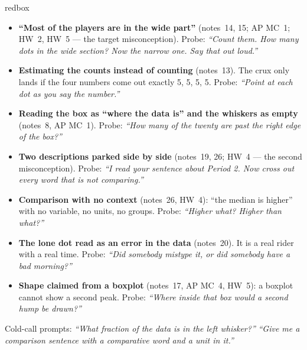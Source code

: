 \documentclass[10pt]{article}
\begin{document}
\boxguard
\begin{skillbox}{redbox}
\begin{itemize}[leftmargin=1.2em, nosep]
  \item \textbf{``Most of the players are in the wide part''} (notes~14, 15; AP MC~1; HW~2, HW~5
        --- the target misconception). Probe: \emph{``Count them. How many dots in the wide
        section? Now the narrow one. Say that out loud.''}
  \item \textbf{Estimating the counts instead of counting} (notes~13). The crux only lands if the
        four numbers come out exactly 5, 5, 5, 5. Probe: \emph{``Point at each dot as you say the
        number.''}
  \item \textbf{Reading the box as ``where the data is'' and the whiskers as empty} (notes~8,
        AP MC~1). Probe: \emph{``How many of the twenty are past the right edge of the box?''}
  \item \textbf{Two descriptions parked side by side} (notes~19, 26; HW~4 --- the second
        misconception). Probe: \emph{``I read your sentence about Period 2. Now cross out every
        word that is not comparing.''}
  \item \textbf{Comparison with no context} (notes~26, HW~4): ``the median is higher'' with no
        variable, no units, no groups. Probe: \emph{``Higher what? Higher than what?''}
  \item \textbf{The lone dot read as an error in the data} (notes~20). It is a real rider with a
        real time. Probe: \emph{``Did somebody mistype it, or did somebody have a bad morning?''}
  \item \textbf{Shape claimed from a boxplot} (notes~17, AP MC~4, HW~5): a boxplot cannot show a
        second peak. Probe: \emph{``Where inside that box would a second hump be drawn?''}
\end{itemize}
Cold-call prompts: \emph{``What fraction of the data is in the left whisker?''} \quad
\emph{``Give me a comparison sentence with a comparative word and a unit in it.''}
\end{skillbox}
\end{document}
